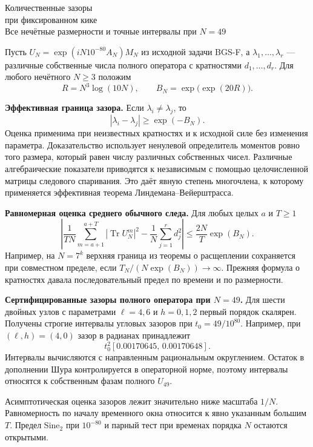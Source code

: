 \documentclass[11pt,a4paper]{article}
\newcommand{\Tr}{\operatorname{Tr}}
\newcommand{\subt}[1]{\par\medskip\noindent\textbf{#1.}\quad}
\begin{document}
\begin{center}{\LARGE\sffamily Количественные зазоры\\[3pt]при фиксированном кике}\\[6pt]
{\large Все нечётные размерности и точные интервалы при \(N=49\)}
\end{center}
Пусть \(U_N=\exp(iN10^{-80}A_N)M_N\) из исходной задачи BGS-F, а \(\lambda_1,\ldots,\lambda_r\) --- различные собственные числа полного оператора с кратностями \(d_1,\ldots,d_r\). Для любого нечётного \(N\ge3\) положим
\[
     R=N^3\log(10N),\qquad B_N=\exp\!\bigl(\exp(20R)\bigr).
\]

\subt{Эффективная граница зазора}
Если \(\lambda_i\ne\lambda_j\), то
\[
             |\lambda_i-\lambda_j|\ge \exp(-B_N).
\]
Оценка применима при неизвестных кратностях и к исходной силе без изменения параметра. Доказательство использует ненулевой определитель моментов ровно того размера, который равен числу различных собственных чисел. Различные алгебраические показатели приводятся к независимым с помощью целочисленной матрицы следового спаривания. Это даёт явную степень многочлена, к которому применяется эффективная теорема Линдемана--Вейерштрасса.

\subt{Равномерная оценка среднего обычного следа}
Для любых целых \(a\) и \(T\ge1\)
\[
 \left|\frac1{TN}\sum_{m=a+1}^{a+T}|\Tr U_N^m|^2
                   -\frac1N\sum_{j=1}^r d_j^2\right|
             \le\frac{2N}{T}\exp(B_N).
\]
Например, на \(N=7^k\) верхняя граница из теоремы о расщеплении сохраняется при совместном пределе, если \(T_N/(N\exp(B_N))\to\infty\). Прежняя формула о кратностях давала последовательный предел по времени и по размерности.

\subt{Сертифицированные зазоры полного оператора при \(N=49\)}
Для шести двойных узлов с параметрами \(\ell=4,6\) и \(h=0,1,2\) первый порядок скалярен. Получены строгие интервалы угловых зазоров при \(t_0=49/10^{80}\). Например, при \((\ell,h)=(4,0)\) зазор в радианах принадлежит
\[
          t_0^2[0.00170645,\,0.00170648].
\]
Интервалы вычисляются с направленным рациональным округлением. Остаток в дополнении Шура контролируется в операторной норме, поэтому интервалы относятся к собственным фазам полного \(U_{49}\).

Асимптотическая оценка зазоров лежит значительно ниже масштаба \(1/N\). Равномерность по началу временного окна относится к явно указанным большим \(T\). Предел Sine\(_2\) при \(10^{-80}\) и парный тест при временах порядка \(N\) остаются открытыми.
\end{document}
